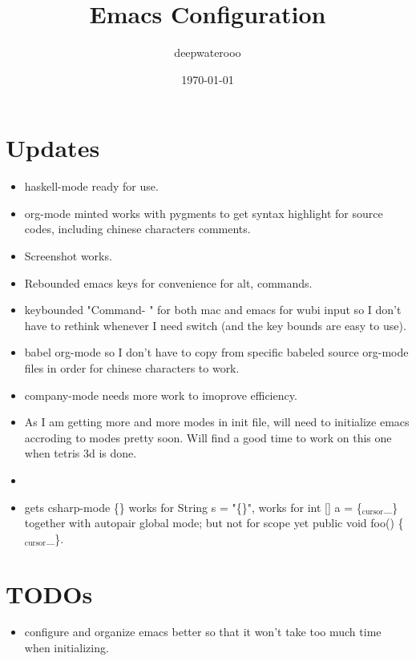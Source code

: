 \documentclass[9pt,b5paper]{article}
\author{deepwaterooo}
\date{\today}
\title{Emacs Configuration}
\begin{document}
\maketitle
\tableofcontents


\section{Updates}
\label{sec-1}
\begin{itemize}
\item haskell-mode ready for use.
\item org-mode minted works with pygments to get syntax highlight for source codes, including chinese characters comments.
\item Screenshot works.
\item Rebounded emacs keys for convenience for alt, commands.
\item keybounded "Command- " for both mac and emacs for wubi input so I don't have to rethink whenever I need switch (and the key bounds are easy to use).
\item babel org-mode so I don't have to copy from specific babeled source org-mode files in order for chinese characters to work.
\item company-mode needs more work to imoprove efficiency.
\item As I am getting more and more modes in init file, will need to initialize emacs accroding to modes pretty soon. Will find a good time to work on this one when tetris 3d is done.
\item 
\item gets csharp-mode \{\} works for String s = "\{\}", works for int [] a = \{$_{\text{cursor}}$\_\} together with autopair global mode; but not for scope yet public void foo() \{$_{\text{cursor}}$\_\}.
\end{itemize}

\section{TODOs}
\label{sec-2}
\begin{itemize}
\item configure and organize emacs better so that it won't take too much time when initializing.
\end{itemize}
\end{document}
